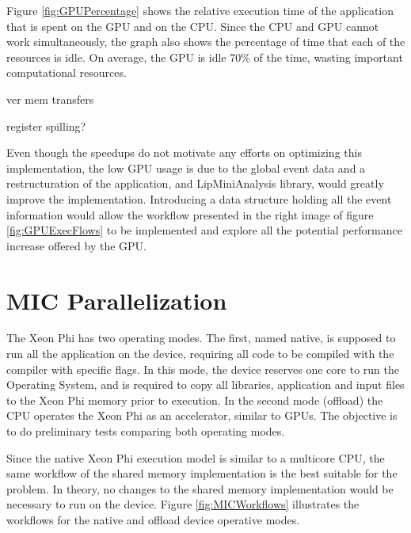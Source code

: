 Figure \ref{fig:GPUPercentage} shows the relative execution time of the application that is spent on the GPU and on the CPU. Since the CPU and GPU cannot work simultaneously, the graph also shows the percentage of time that each of the resources is idle. On average, the GPU is idle 70\% of the time, wasting important computational resources.

ver mem transfers

register spilling?

Even though the speedups do not motivate any efforts on optimizing this implementation, the low GPU usage is due to the global event data and a restructuration of the application, and LipMiniAnalysis library, would greatly improve the implementation. Introducing a data structure holding all the event information would allow the workflow presented in the right image of figure \ref{fig:GPUExecFlows} to be implemented and explore all the potential performance increase offered by the GPU.

\section{MIC Parallelization}
\label{Parallelization:MIC}

The \intel Xeon Phi has two operating modes. The first, named native, is supposed to run all the application on the device, requiring all code to be compiled with the \intel compiler with specific flags. In this mode, the device reserves one core to run the Operating System, and is required to copy all libraries, application and input files to the Xeon Phi memory prior to execution. In the second mode (offload) the CPU operates the Xeon Phi as an accelerator, similar to GPUs. The objective is to do preliminary tests comparing both operating modes.

Since the native Xeon Phi execution model is similar to a multicore CPU, the same workflow of the shared memory implementation is the best suitable for the problem. In theory, no changes to the shared memory implementation would be necessary to run on the device. Figure \ref{fig:MICWorkflows} illustrates the workflows for the native and offload device operative modes.


